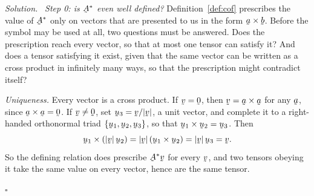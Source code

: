 \documentclass[17pt,a4paper]{extreport}
\DeclareRobustCommand{\vek}[1]{\underaccent{\tilde}{#1}}
\newcommand{\ba}{\vek{a}}
\newcommand{\bb}{\vek{b}}
\newcommand{\bu}{\vek{u}}
\newcommand{\bv}{\vek{v}}
\newcommand{\bze}{\vek{0}}
\newcommand{\bA}{\vek{A}}
\theoremstyle{scplain}
\theoremstyle{scdefn}
\theoremstyle{scplain}
\newenvironment{solution}
 {\par\smallskip\noindent\textit{Solution.}\ }
 {\hfill$\square$\par\medskip}
\begin{document}
\begin{solution}
\emph{Step 0: is $\bA^{*}$ even well defined?}
Definition~\ref{def:cof} prescribes the value of $\bA^{*}$ only on vectors
that are presented to us in the form $\ba\times\bb$. Before the symbol may
be used at all, two questions must be answered. Does the prescription reach
every vector, so that at most one tensor can satisfy it? And does a tensor
satisfying it exist, given that the same vector can be written as a cross
product in infinitely many ways, so that the prescription might contradict
itself?

\emph{Uniqueness.} Every vector is a cross product. If $\bv=\bze$, then
$\bv=\ba\times\ba$ for any $\ba$, since $\ba\times\ba=\bze$. If
$\bv\neq\bze$, set $\bu_{3}=\bv/|\bv|$, a unit vector, and complete it to a
right-handed orthonormal triad $\{\bu_{1},\bu_{2},\bu_{3}\}$, so that
$\bu_{1}\times\bu_{2}=\bu_{3}$. Then
\[
   \bu_{1}\times(|\bv|\,\bu_{2})=|\bv|\,(\bu_{1}\times\bu_{2})
   =|\bv|\,\bu_{3}=\bv .
\]
So the defining relation does prescribe $\bA^{*}\bv$ for every $\bv$, and
two tensors obeying it take the same value on every vector, hence are the
same tensor.


\end{solution}
\end{document}
